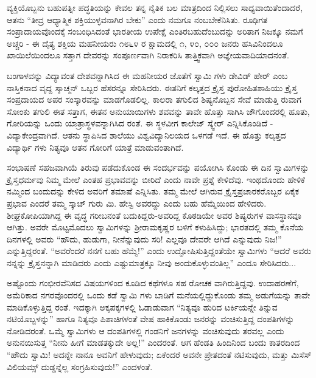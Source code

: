 ವ್ಯಕ್ತಿಯೊಬ್ಬನು ಬಹುಪತ್ನೀ ಪದ್ಧತಿಯನ್ನು ಕೇವಲ ತನ್ನ ನೈತಿಕ ಬಲ ಮಾತ್ರದಿಂದ ನಿಲ್ಲಿಸಲು ಸಾಧ್ಯವಾಯಿತೆಂದಾದರೆ, ಆತನು “ತೀವ್ರ ಆಧ್ಯಾತ್ಮಿಕ ಶಕ್ತಿಯುಳ್ಳವನಾಗಿರ ಬೇಕು” ಎಂದು ನಮಗೂ ನಂಬಬೇಕೆನಿಸಿತು. ರೂಢಿಗತ ಸಂಪ್ರಾದಾಯವೊಂದಕ್ಕೆ ಸಂಬಂಧಿಸಿದಂತೆ ಭಾರತೀಯ ಉಪೇಕ್ಷೆ ಎಂತಿರಬಹುದೆಂಬುದನ್ನು ಅರಿತಾಗ ನಿಜಕ್ಕೂ ನಮಗೆ ಅಚ್ಚರಿ - ಈ ದೈತ್ಯ ಶಕ್ತಿಯ ಮಹನೀಯರು ೧೮೬೪ ರ ಕ್ಷಾಮದಲ್ಲಿ ೧, ೪೦, ೦೦೦ ಜನರು ಹಸಿವಿನಿಂದಲೂ ಖಾಯಿಲೆಯಿಂದಲೂ ಸತ್ತಾಗ ದೇವರನ್ನು ಸಂಪೂರ್ಣವಾಗಿ ನಿರಾಕರಿಸಿ ತಾತ್ತ್ವಿಕವಾಗಿ ಅಜ್ಞೇಯವಾದಿಯಾದನಂತೆ.

ಬಂಗಾಳವನ್ನು ವಿದ್ಯಾವಂತ ದೇಶವನ್ನಾಗಿಸಿದ ಈ ಮಹನೀಯರ ಜೊತೆಗೆ ಸ್ವಾಮಿ ಗಳು ಡೇವಿಡ್ ಹೇರ್ ಎಂಬ ನಾಸ್ತಿಕನಾದ ವೃದ್ದ ಸ್ಕಾಚ್ಮನ್ ಒಬ್ಬರ ಹೆಸರನ್ನೂ ಸೇರಿಸಿದರು. ಈತನಿಗೆ ಕಲ್ಕತ್ತದ ಕ್ರೈಸ್ತ ಪುರೋಹಿತಶಾಹಿಯು ಕ್ರೈಸ್ತ ಸಂಪ್ರದಾಯದ ಅಪರ ಸಂಸ್ಕಾರವನ್ನು ಮಾಡಗೊಡಲಿಲ್ಲ. ಕಾಲರಾ ತಗುಲಿದ ಶಿಷ್ಯನೊಬ್ಬನ ಸೇವೆ ಮಾಡುತ್ತಿ ರುವಾಗ ಸೋಂಕು ತಗುಲಿ ಈತ ಸತ್ತಾಗ, ಈತನ ಅನುಯಾಯಿಗಳು ಶವವನ್ನು ತಾವೇ ಹೊತ್ತು ಸಾಗಿಸಿ ಜೌಗೊಂದರಲ್ಲಿ ಹೂತು, ಗೋರಿಯನ್ನು ಒಂದು ಯಾತ್ರಾಸ್ಥಳವನ್ನಾಗಿಸಿದ ರಂತೆ. ಈ ಸ್ಥಳವೀಗ ಕಾಲೇಜ್ ಸ್ಕ್ವೇರ್ ಎನ್ನಿಸಿಕೊಂಡಿದೆ - ವಿದ್ಯಾಕೇಂದ್ರವಾಗಿದೆ. ಆತನು ಸ್ಥಾಪಿಸಿದ ಶಾಲೆಯು ವಿಶ್ವವಿದ್ಯಾನಿಲಯದ ಒಳಗಡೆ ಇದೆ. ಈ ಹೊತ್ತು ಕಲ್ಕತ್ತದ ವಿದ್ಯಾರ್ಥಿ ಗಳು ನಿತ್ಯವೂ ಆತನ ಗೋರಿಗೆ ಯಾತ್ರೆ ಮಾಡುವಂತಾಗಿದೆ.

ಸಂಭಾಷಣೆ ಸಹಜವಾಗಿಯೆ ತಿರುವು ಪಡೆದುಕೊಂಡ ಈ ಸಂದರ್ಭವನ್ನು ಪಯೋಗಿಸಿ ಕೊಂಡು ಈ ದಿನ ಸ್ವಾಮಿಗಳನ್ನು ಕ್ರೈಸ್ತಧರ್ಮವು ನಿಮ್ಮ ಮೇಲೆ ಎಂತಹ ಪ್ರಭಾವವನ್ನು ಬೀರಿದೆ ಎಂದು ನಾವೇ ಪ್ರಶ್ನೆ ಕೇಳಿದೆವು. ಇಂಥದೊಂದು ಹೇಳಿಕೆ ನಮ್ಮಿಂದ ಬಂದುದನ್ನು ಕೇಳಿದ ಅವರಿಗೆ ತಮಾಷೆ ಎನ್ನಿಸಿತು. ತಮ್ಮ ಮೇಲೆ ಆಗಿರುವ ಕ್ರೈಸ್ತಪ್ರಚಾರಕರೊಬ್ಬರ ಏಕೈಕ ಪ್ರಭಾವ ಎಂದರೆ ತಮ್ಮ ಸ್ಕಾಚ್ ಗುರು ಮಿ. ಹೇಸ್ಟಿ ಅವರದ್ದು ಎಂದು ಬಹು ಹೆಮ್ಮೆಯಿಂದ ಹೇಳಿದರು. ಶೀಘ್ರಕೋಪಿಯಾಗಿದ್ದ ಈ ವೃದ್ಧ ಗರೀಬನಂತೆ ಬದುಕಿದ್ದರು-ಅವರಿದ್ದ ಕೊಠಡಿಯೇ ಅವರ ಶಿಷ್ಯರುಗಳ ವಾಸಸ್ಥಾನವೂ ಆಗಿತ್ತು. ಅವರೇ ಮೊಟ್ಟಮೊದಲು ಸ್ವಾಮಿಗಳನ್ನು ಶ‍್ರೀರಾಮಕೃಷ್ಣರ ಬಳಿಗೆ ಕಳುಹಿಸಿದ್ದು; ಭಾರತದಲ್ಲಿ ತಮ್ಮ ಕೊನೆಯ ದಿನಗಳಲ್ಲಿ ಅವರು “ಹೌದು, ಹುಡುಗಾ, ನೀನೆನ್ನುವುದು ಸರಿ! ಎಲ್ಲವೂ ದೇವರೇ ಆಗಿದೆ ಎನ್ನುವುದು ನಿಜ!” ಎನ್ನುತ್ತಿದ್ದರಂತೆ. “ಅವರೆಂದರೆ ನನಗೆ ಬಹು ಹೆಮ್ಮೆ!” ಎಂದು ಉದ್ಘೋಷಿಸುತ್ತಿದ್ದಂತೆಯೇ ಸ್ವಾಮಿಗಳು “ಆದರೆ ಅವರು ನನ್ನನ್ನು ಕ್ರೈಸ್ತನನ್ನಾಗಿ ಮಾಡಿದರು ಎಂದು ಎಷ್ಟುಮಾತ್ರಕ್ಕೂ ನೀವು ಅಂದುಕೊಳ್ಳುವಂತಿಲ್ಲ” ಎಂದೂ ಸೇರಿಸಿದರು...

ಅಷ್ಟೊಂದು ಗಂಭೀರವೆನಿಸದ ವಿಷಯಗಳಿಂದ ಕೂಡಿದ ಕಥೆಗಳೂ ಸಹ ರೋಚಕ ವಾಗಿರುತ್ತಿದ್ದವು. ಉದಾಹರಣೆಗೆ, ಅಮೆರಿಕಾದ ನಗರವೊಂದರಲ್ಲಿ ಒಂದು ಕಡೆ ಸ್ವಾಮಿ ಗಳು ಬಾಡಿಗೆ ಮನೆಯಲ್ಲಿದ್ದುಕೊಂಡು ತಮ್ಮ ಅಡುಗೆಯನ್ನು ತಾವೇ ಮಾಡಿಕೊಳ್ಳುತ್ತಿದ್ದ ರಂತೆ. ಇದಕ್ಕಾಗಿ ಅಕ್ಕಪಕ್ಕಗಳಲ್ಲಿ ಓಡಾಡುವಾಗ “ನಿತ್ಯವೂ ಹುರಿದ ಟರ್ಕಿಯನ್ನೇ ತಿನ್ನುವ ನಟಿಯೊಬ್ಬಳನ್ನು” ಹಾಗೂ ನಿತ್ಯವೂ ಪಿಶಾಚಿಗಳಂತೆ ವೇಷ ಹಾಕಿಕೊಂಡು ಜನರನ್ನು ವಂಚಿಸುತ್ತಿದ್ದ ದಂಪತಿಗಳನ್ನು ನೋಡಿದರಂತೆ. ಒಮ್ಮೆ ಸ್ವಾಮಿಗಳು ಆ ದಂಪತಿಗಳಲ್ಲಿ ಗಂಡನಿಗೆ ಜನಗಳನ್ನು ವಂಚಿಸುವುದು ತರವಲ್ಲ ಎಂದು ಅನುನಯಿಸುತ್ತ “ನೀನು ಹೀಗೆ ಮಾಡತಕ್ಕುದೇ ಅಲ್ಲ!” ಎಂದರಂತೆ. ಆಗ ಹೆಂಡತಿ ಹಿಂದಿನಿಂದ ಬಂದು ಕಾತರದಿಂದ “ಹೌದು ಸ್ವಾಮಿ! ಅದನ್ನೇ ನಾನೂ ಅವನಿಗೆ ಹೇಳುವುದು; ಏಕೆಂದರೆ ಅವನೇ ಪ್ರೇತದಂತೆ ನಟಿಸುವುದು, ಮತ್ತು ಮಿಸೆಸ್ ವಿಲಿಯಮ್ಸ್ ದುಡ್ಡನ್ನೆಲ್ಲ ಸಂಗ್ರಹಿಸುವುದು!” ಎಂದಳಂತೆ.

